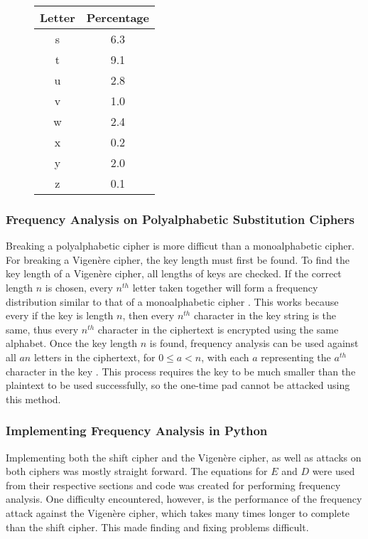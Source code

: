 \documentclass[12pt]{article}
\begin{document}
\begin{figure}[ht]
\begin{center}
\begin{multicols}{3}
			\columnbreak
			
			\begin{tabular}{||c | c||}
				\hline
				Letter & Percentage \\
				\hline\hline
				s & 6.3 \\ 
				\hline 
				t & 9.1 \\
				\hline 
				u & 2.8 \\
				\hline 
				v & 1.0 \\
				\hline 
				w & 2.4 \\
				\hline
				x & 0.2 \\
				\hline
				y & 2.0 \\
				\hline 
				z & 0.1 \\
				\hline 
			\end{tabular}
		\end{multicols}
	\end{center}
	\begin{flushright}
		\cite[pg. 19]{codebook}
	\end{flushright}
\end{figure}

\subsubsection{Frequency Analysis on Polyalphabetic Substitution Ciphers}
Breaking a polyalphabetic cipher is more difficut than a monoalphabetic cipher. For breaking a Vigen\`{e}re cipher, the key length must first be found. To find the key length of a Vigen\`{e}re cipher, all lengths of keys are checked. If the correct length $n$ is chosen, every $n^{th}$ letter taken together will form a frequency distribution similar to that of a monoalphabetic cipher \cite[pg. 72,73]{codebook}. This works because every if the key is length $n$, then every $n^{th}$ character in the key string is the same, thus every $n^{th}$ character in the ciphertext is encrypted using the same alphabet. Once the key length $n$ is found, frequency analysis can be used against all $an$ letters in the ciphertext, for $0\leq a < n$, with each $a$ representing the $a^{th}$ character in the key \cite[pg. 74-76]{codebook}. This process requires the key to be much smaller than the plaintext to be used successfully, so the one-time pad cannot be attacked using this method.

\subsubsection{Implementing Frequency Analysis in Python}
Implementing both the shift cipher and the Vigen\`{e}re cipher, as well as attacks on both ciphers was mostly straight forward. The equations for $E$ and $D$ were used from their respective sections and code was created for performing frequency analysis. One difficulty encountered, however, is the performance of the frequency attack against the Vigen\`{e}re cipher, which takes many times longer to complete than the shift cipher. This made finding and fixing problems difficult.
\end{document}
